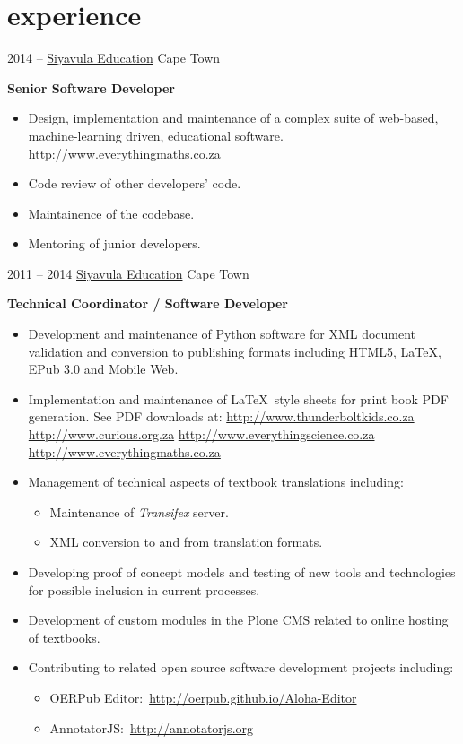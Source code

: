 \documentclass[]{friggeri-cv} %
\begin{document}
\section{experience}
\begin{entrylist}
\entry
{2014 -- }
{\href{http://www.siyavula.com}{Siyavula Education}}
{Cape Town}
{%
\textbf{Senior Software Developer}
\begin{itemize}
\setlength{\itemsep}{5pt}
\item Design, implementation and maintenance of a complex suite of web-based, machine-learning driven, educational software.
    \subitem \url{http://www.everythingmaths.co.za}
    \item Code review of other developers' code.
    \item Maintainence of the codebase.
    \item Mentoring of junior developers.
\end{itemize}
}
\entry
{2011 -- 2014 }
{\href{http://www.siyavula.com}{Siyavula Education}}
{Cape Town}
{%
\textbf{Technical Coordinator / Software Developer}
\begin{itemize}
\setlength{\itemsep}{5pt}
\item Development and maintenance of Python software for XML document validation and conversion to publishing formats including HTML5, \LaTeX, EPub 3.0 and Mobile Web.
\item Implementation and maintenance of \LaTeX~style sheets for print book PDF generation. See PDF downloads at:
    \subitem \url{http://www.thunderboltkids.co.za}
    \subitem \url{http://www.curious.org.za}
    \subitem \url{http://www.everythingscience.co.za}
    \subitem \url{http://www.everythingmaths.co.za}

\item Management of technical aspects of textbook translations including:
\begin{itemize}
    \renewcommand{\labelitemii}{$\cdot$}
    \item Maintenance of \emph{Transifex} server.
    \item XML conversion to and from translation formats.
\end{itemize}

\item Developing proof of concept models and testing of new tools and technologies for possible inclusion in current processes.

\item Development of custom modules in the Plone CMS related to online hosting of textbooks.

\item Contributing to related open source software development projects including:
\begin{itemize}
    \renewcommand{\labelitemii}{$\cdot$}
    \item OERPub Editor:~\url{http://oerpub.github.io/Aloha-Editor}
    \item AnnotatorJS:~\url{http://annotatorjs.org}
\end{itemize}
\end{itemize}
}
\end{entrylist}
\end{document}
